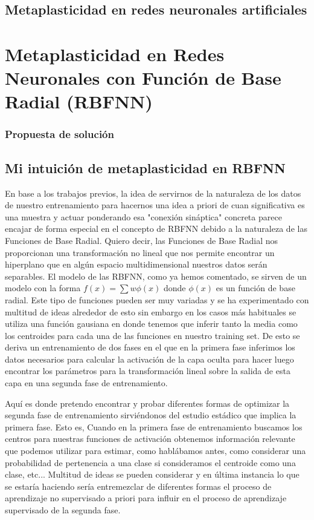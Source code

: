 \documentclass[10pt,a4paper, twocolumn]{report}
\begin{document}
\section{Metaplasticidad en redes neuronales artificiales}
\chapter{Metaplasticidad en Redes Neuronales con Función de Base Radial (RBFNN)}
\subsection{Propuesta de solución}
\section{Mi intuición de metaplasticidad en RBFNN}
En base a los trabajos previos, la idea de servirnos de la naturaleza de los datos de nuestro entrenamiento para hacernos una idea a priori de cuan significativa es una muestra y actuar ponderando esa "conexión sináptica" concreta parece encajar de forma especial en el concepto de RBFNN debido a la naturaleza de las Funciones de Base Radial. Quiero decir, las Funciones de Base Radial nos proporcionan una transformación no lineal que nos permite encontrar un hiperplano que en algún espacio multidimensional nuestros datos serán separables. El modelo de las RBFNN, como ya hemos comentado, se sirven de un modelo con la forma $f(x)=\sum w \phi(x)$ donde $\phi(x)$ es un función de base radial. Este tipo de funciones pueden ser muy variadas y se ha experimentado con multitud de ideas alrededor de esto sin embargo en los casos más habituales se utiliza una función gausiana en donde tenemos que inferir tanto la media como los centroides para cada una de las funciones en nuestro training set. De esto se deriva un entrenamiento de dos fases en el que en la primera fase inferimos los datos necesarios para calcular la activación de la capa oculta para hacer luego encontrar los parámetros para la transformación lineal sobre la salida de esta capa en una segunda fase de entrenamiento.

Aquí es donde pretendo encontrar y probar diferentes formas de optimizar la segunda fase de entrenamiento sirviéndonos del estudio estádico que implica la primera fase. Esto es, Cuando en la primera fase de entrenamiento buscamos los centros para nuestras funciones de activación obtenemos información relevante que podemos utilizar para estimar, como hablábamos antes, como considerar una probabilidad de pertenencia a una clase si consideramos el centroide como una clase, etc... Multitud de ideas se pueden considerar y en última instancia lo que se estaría haciendo sería entremezclar de diferentes formas el proceso de aprendizaje no supervisado a priori para influir en el proceso de aprendizaje supervisado de la segunda fase.
\end{document}
